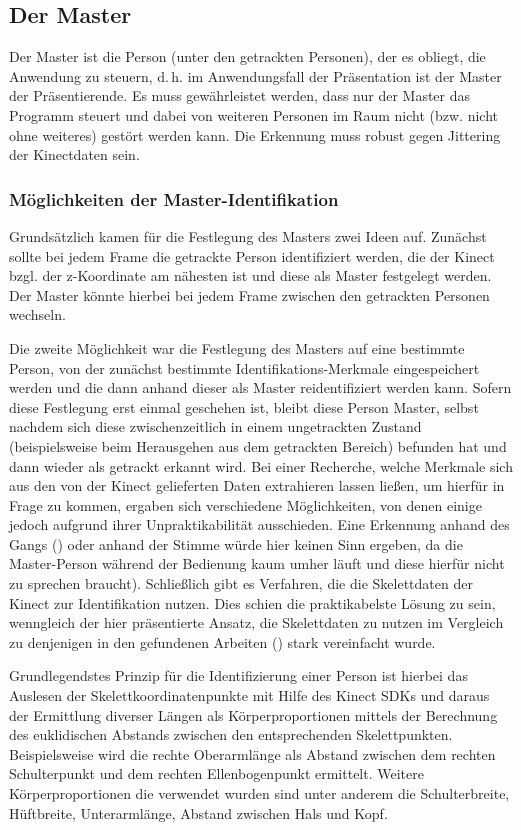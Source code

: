 \subsection{Der Master}\label{sec:master}
	Der Master ist die Person (unter den getrackten Personen), der es obliegt, die Anwendung zu steuern, d.\,h. im Anwendungsfall der Präsentation ist der Master der Präsentierende.
	Es muss gewährleistet werden, dass nur der Master das Programm steuert und dabei von weiteren Personen im Raum nicht (bzw. nicht ohne weiteres) gestört werden kann. Die Erkennung muss robust gegen Jittering der Kinectdaten sein.\par
\subsubsection{Möglichkeiten der Master-Identifikation}
	Grundsätzlich kamen für die Festlegung des Masters zwei Ideen auf. Zunächst sollte bei jedem Frame die getrackte Person identifiziert werden, die der Kinect bzgl. der z-Koordinate am nähesten ist und diese als Master festgelegt werden. Der Master könnte hierbei bei jedem Frame zwischen den getrackten Personen wechseln. \par
	Die zweite Möglichkeit war die Festlegung des Masters auf eine bestimmte Person, von der zunächst bestimmte Identifikations-Merkmale eingespeichert werden und die dann anhand dieser als Master reidentifiziert werden kann. Sofern diese Festlegung erst einmal geschehen ist, bleibt diese Person Master, selbst nachdem sich diese zwischenzeitlich in einem ungetrackten Zustand (beispielsweise beim Herausgehen aus dem getrackten Bereich) befunden hat und dann wieder als getrackt erkannt wird. Bei einer Recherche, welche Merkmale sich aus den von der Kinect gelieferten Daten extrahieren lassen ließen, um hierfür in Frage zu kommen, ergaben sich verschiedene Möglichkeiten, von denen einige jedoch aufgrund ihrer Unpraktikabilität ausschieden. Eine Erkennung anhand des Gangs (\cite{gait}) oder anhand der Stimme würde hier keinen Sinn ergeben, da die Master-Person während der Bedienung kaum umher läuft und diese hierfür nicht zu sprechen braucht). Schließlich gibt es Verfahren, die die Skelettdaten der Kinect zur Identifikation nutzen. Dies schien die praktikabelste Lösung zu sein, wenngleich der hier präsentierte Ansatz, die Skelettdaten zu nutzen im Vergleich zu denjenigen in den gefundenen Arbeiten (\cite{bodyprop}) stark vereinfacht wurde.\par
	Grundlegendstes Prinzip für die Identifizierung einer Person ist hierbei das Auslesen der Skelettkoordinatenpunkte mit Hilfe des Kinect SDKs und daraus der Ermittlung diverser Längen als Körperproportionen mittels der Berechnung des euklidischen Abstands zwischen den entsprechenden Skelettpunkten. Beispielsweise wird die rechte Oberarmlänge als Abstand zwischen dem rechten Schulterpunkt und dem rechten Ellenbogenpunkt ermittelt. Weitere Körperproportionen die verwendet wurden sind unter anderem die Schulterbreite, Hüftbreite, Unterarmlänge, Abstand zwischen Hals und Kopf. \par

